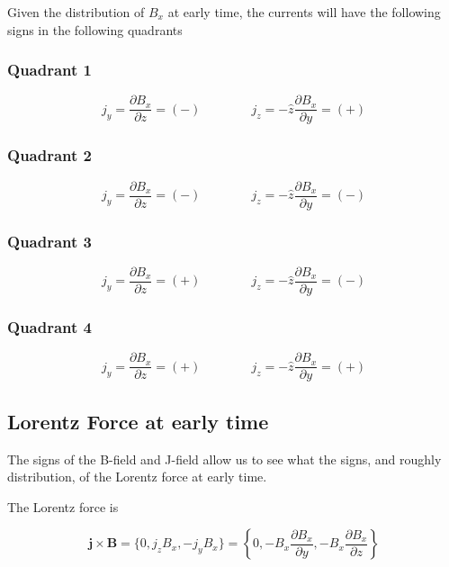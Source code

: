 \documentclass[11pt]{article}
\begin{document}
Given the distribution of $B_x$ at early time, the currents will have the following signs in the following quadrants
\subsubsection{Quadrant 1}
\begin{equation}
	j_y	= \frac{\partial B_x}{\partial z} = (-)
	\qquad \qquad
	j_z = - \hat{z} \frac{\partial B_x}{\partial y} = (+)
\end{equation}

\subsubsection{Quadrant 2}
\begin{equation}
	j_y	= \frac{\partial B_x}{\partial z} = (-)
	\qquad \qquad
	j_z = - \hat{z} \frac{\partial B_x}{\partial y} = (-)
\end{equation}
\subsubsection{Quadrant 3}
\begin{equation}
	j_y	= \frac{\partial B_x}{\partial z} = (+)
	\qquad \qquad
	j_z = - \hat{z} \frac{\partial B_x}{\partial y} = (-)
\end{equation}
\subsubsection{Quadrant 4}
\begin{equation}
	j_y	= \frac{\partial B_x}{\partial z} = (+)
	\qquad \qquad
	j_z = - \hat{z} \frac{\partial B_x}{\partial y} = (+)
\end{equation}

\subsection{Lorentz Force at early time}
The signs of the B-field and J-field allow us to see what the signs, and roughly distribution, of the Lorentz force at early time.

The Lorentz force is

\begin{equation}
	\pmb{j} \times \pmb{B}
	=
	\{
	0 ,
	j_z B_x ,
	-j_y B_x
	\}
	=
	\left\{
	0 ,
	- B_x \frac{\partial B_x}{\partial y} ,
	- B_x \frac{\partial B_x}{\partial z}
	\right\}
\end{equation}
\end{document}
